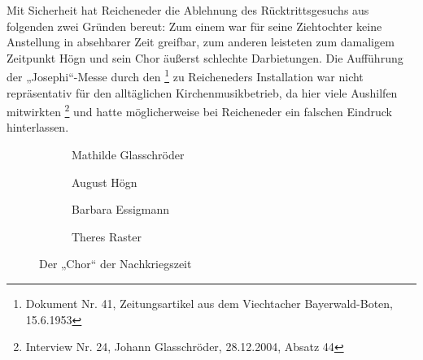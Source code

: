 Mit Sicherheit hat Reicheneder die Ablehnung des Rücktrittsgesuchs aus
folgenden zwei Gründen bereut: Zum einem war für seine Ziehtochter
keine Anstellung in absehbarer Zeit greifbar, zum anderen leisteten zum
damaligem Zeitpunkt Högn und sein Chor äußerst schlechte Darbietungen.
Die Aufführung der „Josephi“-Messe durch den
\footnote{Dokument Nr. 41, Zeitungsartikel aus dem Viechtacher
Bayerwald-Boten, 15.6.1953} zu Reicheneders Installation war nicht
repräsentativ für den alltäglichen Kirchenmusikbetrieb, da hier viele
Aushilfen mitwirkten \footnote{Interview Nr. 24, Johann Glasschröder,
28.12.2004, Absatz 44} und hatte möglicherweise bei Reicheneder ein
falschen Eindruck hinterlassen.

\begin{figure}
\begin{subfigure}[b]{0.2\linewidth}
\caption{Mathilde Glasschröder}
\end{subfigure}
\begin{subfigure}[b]{0.2\linewidth}
\caption{August Högn}
\end{subfigure}
\begin{subfigure}[b]{0.2\linewidth}
\caption{Barbara Essigmann}
\end{subfigure}
\begin{subfigure}[b]{0.2\linewidth}
\caption{Theres Raster}
\end{subfigure}
\caption{Der „Chor“ der Nachkriegszeit}
\end{figure}

